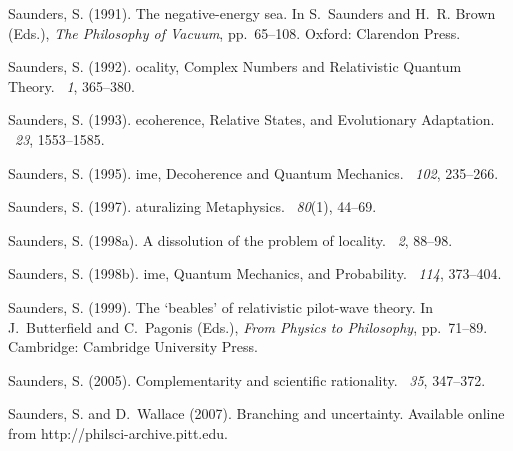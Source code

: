 \documentclass[12pt]{article}
\begin{document}
\begin{thebibliography}{}
Saunders, S. (1991).
\newblock The negative-energy sea.
\newblock In S.~Saunders and H.~R. Brown (Eds.), {\em The Philosophy of
  Vacuum}, pp.\  65--108. Oxford: Clarendon Press.

Saunders, S. (1992).
ocality, {C}omplex {N}umbers and {R}elativistic {Q}uantum
  {T}heory.
~{\em 1}, 365--380.

Saunders, S. (1993).
ecoherence, {R}elative {S}tates, and {E}volutionary {A}daptation.
~{\em 23}, 1553--1585.

Saunders, S. (1995).
ime, {D}ecoherence and {Q}uantum {M}echanics.
~{\em 102}, 235--266.

Saunders, S. (1997).
aturalizing {M}etaphysics.
~{\em 80\/}(1), 44--69.

Saunders, S. (1998a).
\newblock A dissolution of the problem of locality.
~{\em 2},
  88--98.

Saunders, S. (1998b).
ime, {Q}uantum {M}echanics, and {P}robability.
~{\em 114}, 373--404.

Saunders, S. (1999).
\newblock The `beables' of relativistic pilot-wave theory.
\newblock In J.~Butterfield and C.~Pagonis (Eds.), {\em From Physics to
  Philosophy}, pp.\  71--89. Cambridge: Cambridge University Press.

Saunders, S. (2005).
\newblock Complementarity and scientific rationality.
~{\em 35}, 347--372.

Saunders, S. and D.~Wallace (2007).
\newblock Branching and uncertainty.
\newblock Available online from http://philsci-archive.pitt.edu.


\end{thebibliography}
\end{document}
